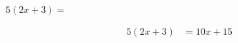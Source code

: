  $5(2x + 3) =$

\begin{solutionbox}{2.5cm}
    \begin{align*}
        5(2x + 3) & =10x+15
    \end{align*}
\end{solutionbox}
